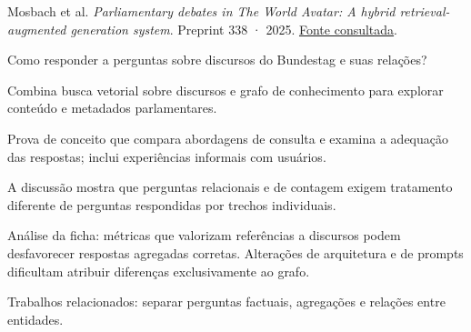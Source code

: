 {\small Mosbach et al. \textit{Parliamentary debates in The World Avatar: A hybrid retrieval-augmented generation system}. Preprint 338 · 2025. \href{https://como.ceb.cam.ac.uk/media/preprints/c4e-preprint-338.pdf}{Fonte consultada}.\par}

Como responder a perguntas sobre discursos do Bundestag e suas relações?

Combina busca vetorial sobre discursos e grafo de conhecimento para explorar conteúdo e metadados parlamentares.

Prova de conceito que compara abordagens de consulta e examina a adequação das respostas; inclui experiências informais com usuários.

A discussão mostra que perguntas relacionais e de contagem exigem tratamento diferente de perguntas respondidas por trechos individuais.

\begin{itemize}
\end{itemize}

Análise da ficha: métricas que valorizam referências a discursos podem desfavorecer respostas agregadas corretas. Alterações de arquitetura e de prompts dificultam atribuir diferenças exclusivamente ao grafo.

Trabalhos relacionados: separar perguntas factuais, agregações e relações entre entidades.

